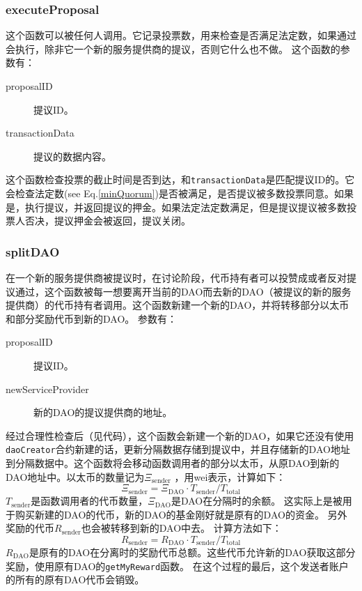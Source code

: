 \documentclass[9pt,oneside]{amsart}
\begin{document}
\begin{multicols}{2}
\begin{description}
\subsubsection*{executeProposal}
这个函数可以被任何人调用。它记录投票数，用来检查是否满足法定数，如果通过会执行，除非它一个新的服务提供商的提议，否则它什么也不做。
这个函数的参数有：
\begin{description}
 \item[proposalID] 提议ID。
 \item[transactionData] 提议的数据内容。
\end{description}
这个函数检查投票的截止时间是否到达，和\verb|transactionData|是匹配提议ID的。它会检查法定数(see Eq.\ref{minQuorum})是否被满足，是否提议被多数投票同意。如果是，执行提议，并返回提议的押金。如果法定法定数满足，但是提议提议被多数投票人否决，提议押金会被返回，提议关闭。

\subsubsection*{splitDAO}
在一个新的服务提供商被提议时，在讨论阶段，代币持有者可以投赞成或者反对提议通过，这个函数被每一想要离开当前的DAO而去新的DAO（被提议的新的服务提供商）的代币持有者调用。这个函数新建一个新的DAO，并将转移部分以太币和部分奖励代币到新的DAO。
参数有：
\begin{description}
 \item[proposalID] 提议ID。
 \item[newServiceProvider] 新的DAO的提议提供商的地址。
\end{description}
经过合理性检查后（见代码），这个函数会新建一个新的DAO，如果它还没有使用\verb|daoCreator|合约新建的话，更新分隔数据存储到提议中，并且存储新的DAO地址到分隔数据中。这个函数将会移动函数调用者的部分以太币，从原DAO到新的DAO地址中。以太币的数量记为$\Xi_{\text{sender}}$ ，用wei表示，计算如下：
\begin{equation}
 \Xi_{\text{sender}} = \Xi_{\text{DAO}} \cdot T_{\text{sender}} / T_{\text{total}}
\end{equation}
$T_{\text{sender}}$是函数调用者的代币数量，$\Xi_{\text{DAO}}$是DAO在分隔时的余额。
这实际上是被用于购买新建的DAO的代币，新的DAO的基金刚好就是原有的DAO的资金。
另外奖励的代币$R_{\text{sender}}$也会被转移到新的DAO中去。
计算方法如下：
\begin{equation}
 R_{\text{sender}} = R_{\text{DAO}} \cdot T_{\text{sender}} / T_{\text{total}}
\end{equation}
$R_{\text{DAO}}$是原有的DAO在分离时的奖励代币总额。这些代币允许新的DAO获取这部分奖励，使用原有DAO的\verb|getMyReward|函数。
在这个过程的最后，这个发送者账户的所有的原有DAO代币会销毁。


\end{description}
\end{multicols}
\end{document}
